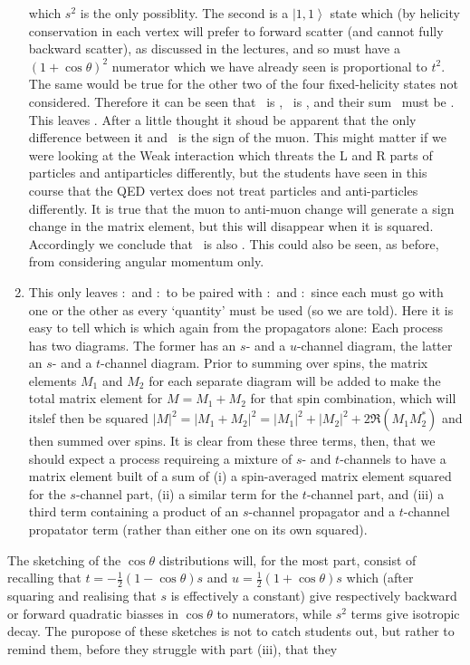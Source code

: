 \documentclass[txfonts]{NSTexam}
\begin{document}
\begin{questions}
\begin{enumerate}
which $s^2$ is the only possiblity.  The second is a $\left|1,1\right>$ state which (by helicity conservation in each vertex will prefer to forward scatter (and cannot fully backward scatter), as discussed in the lectures, and so must have a $(1+\cos\theta)^2$ numerator which we have already seen is proportional to $t^2$.  The same would be true for the other two of the four fixed-helicity states not considered.  Therefore it can be seen that \msqeRmuR\ is \proceRmuR, \msqeRmuL\ is \proceRmuL,
and their sum \msqemuSS\ must be \procemuSS.  This leaves \procemuOS.  %
After a little thought it shoud be apparent that the only difference between it and \procemuSS\ is the sign of the muon.  This might matter if we were looking at the Weak interaction which threats the L and R parts of particles and antiparticles differently, but the students have seen in this course that the QED vertex does not treat particles and anti-particles differently. It
is true that the muon to anti-muon change will generate a sign change in the matrix element, but this will disappear when it is squared.  Accordingly we conclude that \procemuOS\ is also \msqemuSS.  This could also be seen, as before, from considering angular momentum only. 
\item
    This only leaves 
\numbermoeller:\procmoeller\ and 
\numberbhabha:\procbhabha\ to be paired with 
\labmoeller:\msqmoeller\ and
\labbhabha:\msqbhabha\ since each must go with one or the other as every `quantity' must be used (so we are told). Here it is easy to tell which is which again from the propagators alone:  Each process has two diagrams.  The former has an $s$- and a $u$-channel diagram, the latter an $s$- and a $t$-channel diagram. Prior to summing over spins, the matrix elements $M_1$ and $M_2$ for each separate diagram will be added to make the total matrix element for $M=M_1+M_2$ for that spin combination, which will
itslef then be squared $|M|^2 = |M_1+M_2|^2 = |M_1|^2 + |M_2|^2 + 2\Re(M_1 M_2^*)$ and then summed over spins. It is clear from these three terms, then, that we should expect a process requireing a mixture of $s$- and $t$-channels to have a matrix element built of a sum of (i) a spin-averaged matrix element squared for the $s$-channel part, (ii) a similar term for the $t$-channel part, and (iii) a third term containing a product of an $s$-channel propagator and a $t$-channel propatator
term (rather than either one on its own squared).
\end{enumerate}
The sketching of the $\cos\theta$ distributions will, for the most part, consist of recalling that $t=-\frac 1 2(1-\cos\theta)s$ and $u=\frac 1 2(1+\cos\theta)s$ which (after squaring and realising that $s$ is effectively a constant) give respectively backward or forward quadratic biasses in $\cos\theta$ to numerators, while $s^2$ terms give isotropic decay. The puropose of these sketches is not to catch students out, but rather to remind them, before they struggle with part (iii), that they

\end{questions}
\end{document}
